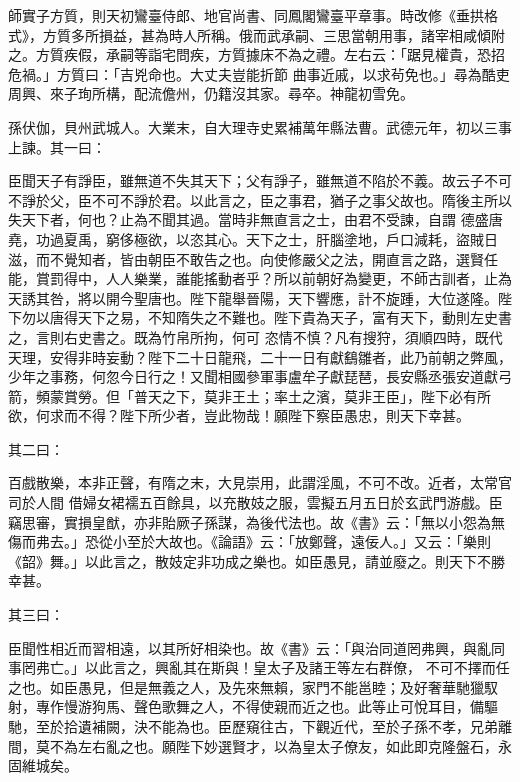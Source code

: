 \begin{pinyinscope}
 師實子方質，則天初鸞臺侍郎、地官尚書、同鳳閣鸞臺平章事。時改修《垂拱格式》，方質多所損益，甚為時人所稱。俄而武承嗣、三思當朝用事，諸宰相咸傾附之。方質疾假，承嗣等詣宅問疾，方質據床不為之禮。左右云：「踞見權貴，恐招危禍。」方質曰：「吉兇命也。大丈夫豈能折節
 曲事近戚，以求茍免也。」尋為酷吏周興、來子珣所構，配流儋州，仍籍沒其家。尋卒。神龍初雪免。



 孫伏伽，貝州武城人。大業末，自大理寺史累補萬年縣法曹。武德元年，初以三事上諫。其一曰：



 臣聞天子有諍臣，雖無道不失其天下；父有諍子，雖無道不陷於不義。故云子不可不諍於父，臣不可不諍於君。以此言之，臣之事君，猶子之事父故也。隋後主所以失天下者，何也？止為不聞其過。當時非無直言之士，由君不受諫，自謂
 德盛唐堯，功過夏禹，窮侈極欲，以恣其心。天下之士，肝腦塗地，戶口減耗，盜賊日滋，而不覺知者，皆由朝臣不敢告之也。向使修嚴父之法，開直言之路，選賢任能，賞罰得中，人人樂業，誰能搖動者乎？所以前朝好為變更，不師古訓者，止為天誘其咎，將以開今聖唐也。陛下龍舉晉陽，天下響應，計不旋踵，大位遂隆。陛下勿以唐得天下之易，不知隋失之不難也。陛下貴為天子，富有天下，動則左史書之，言則右史書之。既為竹帛所拘，何可
 恣情不慎？凡有搜狩，須順四時，既代天理，安得非時妄動？陛下二十日龍飛，二十一日有獻鷂雛者，此乃前朝之弊風，少年之事務，何忽今日行之！又聞相國參軍事盧牟子獻琵琶，長安縣丞張安道獻弓箭，頻蒙賞勞。但「普天之下，莫非王土；率土之濱，莫非王臣」，陛下必有所欲，何求而不得？陛下所少者，豈此物哉！願陛下察臣愚忠，則天下幸甚。



 其二曰：



 百戲散樂，本非正聲，有隋之末，大見崇用，此謂淫風，不可不改。近者，太常官司於人間
 借婦女裙襦五百餘具，以充散妓之服，雲擬五月五日於玄武門游戲。臣竊思審，實損皇猷，亦非貽厥子孫謀，為後代法也。故《書》云：「無以小怨為無傷而弗去。」恐從小至於大故也。《論語》云：「放鄭聲，遠佞人。」又云：「樂則《韶》舞。」以此言之，散妓定非功成之樂也。如臣愚見，請並廢之。則天下不勝幸甚。



 其三曰：



 臣聞性相近而習相遠，以其所好相染也。故《書》云：「與治同道罔弗興，與亂同事罔弗亡。」以此言之，興亂其在斯與！皇太子及諸王等左右群僚，
 不可不擇而任之也。如臣愚見，但是無義之人，及先來無賴，家門不能邕睦；及好奢華馳獵馭射，專作慢游狗馬、聲色歌舞之人，不得使親而近之也。此等止可悅耳目，備驅馳，至於拾遺補闕，決不能為也。臣歷窺往古，下觀近代，至於子孫不孝，兄弟離間，莫不為左右亂之也。願陛下妙選賢才，以為皇太子僚友，如此即克隆盤石，永固維城矣。




\end{pinyinscope}
